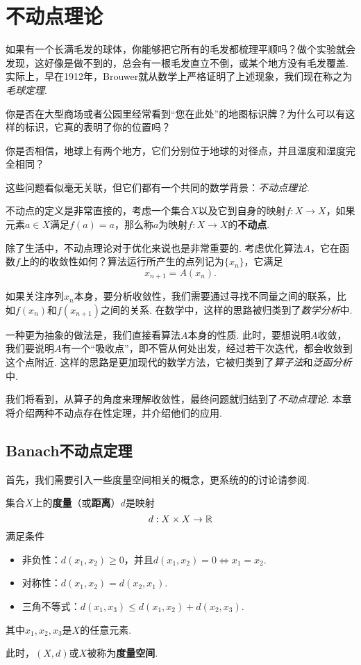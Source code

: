\chapter{不动点理论}\label{chap:fixed-point-theory}

如果有一个长满毛发的球体，你能够把它所有的毛发都梳理平顺吗？做个实验就会发现，这好像是做不到的，总会有一根毛发直立不倒，或某个地方没有毛发覆盖. 实际上，早在1912年，Brouwer就从数学上严格证明了上述现象，我们现在称之为\textit{毛球定理}.

你是否在大型商场或者公园里经常看到“您在此处”的地图标识牌？为什么可以有这样的标识，它真的表明了你的位置吗？

你是否相信，地球上有两个地方，它们分别位于地球的对径点，并且温度和湿度完全相同？

这些问题看似毫无关联，但它们都有一个共同的数学背景：\textit{不动点理论}.

不动点的定义是非常直接的，考虑一个集合$X$以及它到自身的映射$f:X\to X$，如果元素$a\in X$满足$f(a)=a$，那么称$a$为映射$f:X\to X$的\textbf{不动点}. 

除了生活中，不动点理论对于优化来说也是非常重要的. 考虑优化算法$A$，它在函数$f$上的的收敛性如何？算法运行所产生的点列记为$\{x_n\}$，它满足
\[x_{n+1}=A(x_n).\] 

如果关注序列$x_n$本身，要分析收敛性，我们需要通过寻找不同量之间的联系，比如$f(x_n)$和$f(x_{n+1})$之间的关系. 在数学中，这样的思路被归类到了\textit{数学分析}中.  

一种更为抽象的做法是，我们直接看算法$A$本身的性质. 此时，要想说明$A$收敛，我们要说明$A$有一个“吸收点”，即不管从何处出发，经过若干次迭代，都会收敛到这个点附近. 这样的思路是更加现代的数学方法，它被归类到了\textit{算子法}和\textit{泛函分析}中. 

我们将看到，从算子的角度来理解收敛性，最终问题就归结到了\textit{不动点理论}. 本章将介绍两种不动点存在性定理，并介绍他们的应用.

\section{Banach不动点定理}

首先，我们需要引入一些度量空间相关的概念，更系统的的讨论请参阅.

\begin{definition}[度量与度量空间]
集合$X$上的\textbf{度量}（或\textbf{距离}）$d$是映射
\[d:X\times X\to \mathbb{R}\]
满足条件
\begin{itemize}
\item 非负性：$d(x_1,x_2)\geq 0$，并且$d(x_1,x_2)=0\iff x_1=x_2$.
\item 对称性：$d(x_1,x_2)=d(x_2,x_1)$.
\item 三角不等式：$d(x_1,x_3)\leq d(x_1,x_2)+d(x_2,x_3)$.
\end{itemize}
其中$x_1,x_2,x_3$是$X$的任意元素. 

此时，$(X,d)$或$X$被称为\textbf{度量空间}.
\end{definition}

